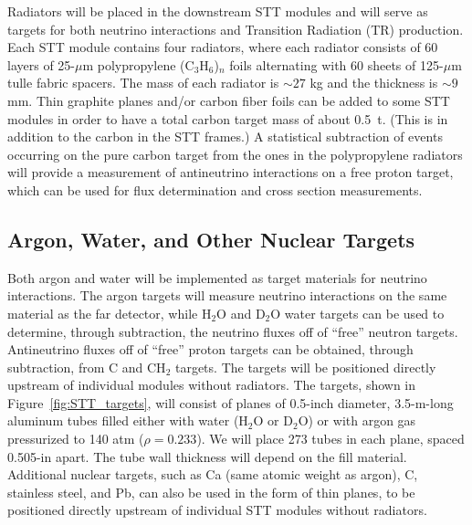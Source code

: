 Radiators will be placed in the downstream STT modules
and will serve as targets for both neutrino interactions 
and Transition Radiation (TR) production. Each STT module contains 
four radiators, where each radiator consists of
60 layers of 25-$\mu$m polypropylene (C$_3$H$_6$)$_n$ 
foils alternating with 60 sheets of 125-$\mu$m tulle fabric spacers. 
The mass of each radiator is $\sim27$ kg and the thickness is 
$\sim9$ mm. 
Thin graphite planes and/or carbon fiber foils can be added to some STT modules
in order to have a total carbon target mass of about 0.5~t. (This is in addition to
the carbon in the STT frames.) A statistical subtraction of events occurring
on the pure carbon target from the ones in the polypropylene radiators will provide a measurement of
antineutrino interactions on a free proton target, which can be used for flux determination and cross
section measurements.

\subsection{Argon, Water, and Other Nuclear Targets}

Both argon
and water will be implemented as target materials for neutrino interactions.
The argon targets will measure neutrino interactions on the same material as the far detector, while
H$_2$O and D$_2$O water targets can be used to determine, through subtraction, the
neutrino fluxes off of ``free'' neutron targets. Antineutrino fluxes off of ``free''
proton targets can be obtained, through subtraction, from C and CH$_2$ targets.
The targets will be 
positioned directly upstream of individual modules without radiators. 
The targets, shown in 
Figure~\ref{fig:STT_targets}, will consist of planes of 0.5-inch diameter, 3.5-m-long aluminum tubes filled
either with water (H$_2$O or D$_2$O) or with argon gas pressurized to 140 atm ($\rho = 0.233$). 
We will place 273 tubes in each 
plane, spaced 0.505-in apart. The tube wall thickness will depend on the fill material.
Additional nuclear targets, such as Ca (same atomic weight as argon), C, stainless
steel, and Pb, can also be used in
the form of thin planes, to be positioned directly upstream of individual STT modules without radiators.


